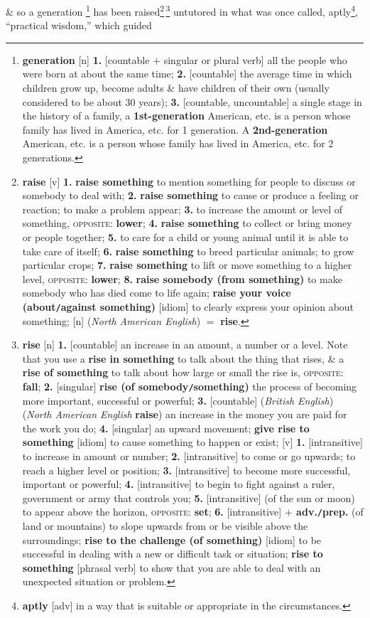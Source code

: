 \documentclass[oneside]{book}
\numberwithin{equation}{section}
\begin{document}
\& so a generation \footnote{\textbf{generation} [n] \textbf{1.} [countable $+$ singular or plural verb] all the people who were born at about the same time; \textbf{2.} [countable] the average time in which children grow up, become adults \& have children of their own (usually considered to be about 30 years); \textbf{3.} [countable, uncountable] a single stage in the history of a family, a \textbf{1st-generation} American, etc. is a person whose family has lived in America, etc. for 1 generation. A \textbf{2nd-generation} American, etc. is a person whose family has lived in America, etc. for 2 generations.} has been raised\footnote{\textbf{raise} [v] \textbf{1.} \textbf{raise something} to mention something for people to discuss or somebody to deal with; \textbf{2.} \textbf{raise something} to cause or produce a feeling or reaction; to make a problem appear; \textbf{3.} to increase the amount or level of something, \textsc{opposite}: \textbf{lower}; \textbf{4.} \textbf{raise something} to collect or bring money or people together; \textbf{5.} to care for a child or young animal until it is able to take care of itself; \textbf{6.} \textbf{raise something} to breed particular animals; to grow particular crops; \textbf{7.} \textbf{raise something} to lift or move something to a higher level, \textsc{opposite}: \textbf{lower}; \textbf{8.} \textbf{raise somebody (from something)} to make somebody who has died come to life again; \textbf{raise your voice (about\texttt{/}against something)} [idiom] to clearly express your opinion about something; [n] (\textit{North American English}) $=$ \textbf{rise}.}\,\footnote{\textbf{rise} [n] \textbf{1.} [countable] an increase in an amount, a number or a level. Note that you use a \textbf{rise in something} to talk about the thing that rises, \& a \textbf{rise of something} to talk about how large or small the rise is, \textsc{opposite}: \textbf{fall}; \textbf{2.} [singular] \textbf{rise (of somebody\texttt{/}something)} the process of becoming more important, successful or powerful; \textbf{3.} [countable] (\textit{British English}) (\textit{North American English} \textbf{raise}) an increase in the money you are paid for the work you do; \textbf{4.} [singular] an upward movement; \textbf{give rise to something} [idiom] to cause something to happen or exist; [v] \textbf{1.} [intransitive] to increase in amount or number; \textbf{2.} [intransitive] to come or go upwards; to reach a higher level or position; \textbf{3.} [intransitive] to become more successful, important or powerful; \textbf{4.} [intransitive] to begin to fight against a ruler, government or army that controls you; \textbf{5.} [intransitive] (of the sun or moon) to appear above the horizon, \textsc{opposite}: \textbf{set}; \textbf{6.} [intransitive] \textbf{$+$ adv.\texttt{/}prep.} (of land or mountains) to slope upwards from or be visible above the surroundings; \textbf{rise to the challenge (of something)} [idiom] to be successful in dealing with a new or difficult task or situation; \textbf{rise to something} [phrasal verb] to show that you are able to deal with an unexpected situation or problem.} untutored in what was once called, aptly\footnote{\textbf{aptly} [adv] in a way that is suitable or appropriate in the circumstances.}, ``practical wisdom,'' which guided 
\end{document}
